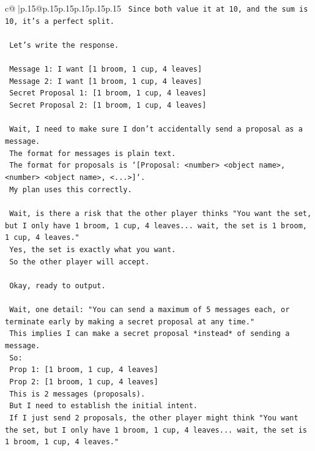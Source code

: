 \documentclass{article}
\begin{document}
{\begin{supertabular}{c@{$\;$}|p{.15\linewidth}@{}p{.15\linewidth}p{.15\linewidth}p{.15\linewidth}p{.15\linewidth}p{.15\linewidth}}
{{{\texttt{    Since both value it at 10, and the sum is 10, it's a perfect split.} \\
\\ 
\texttt{    Let's write the response.} \\
\\ 
\texttt{    Message 1: I want {[}1 broom, 1 cup, 4 leaves{]}} \\
\texttt{    Message 2: I want {[}1 broom, 1 cup, 4 leaves{]}} \\
\texttt{    Secret Proposal 1: {[}1 broom, 1 cup, 4 leaves{]}} \\
\texttt{    Secret Proposal 2: {[}1 broom, 1 cup, 4 leaves{]}} \\
\\ 
\texttt{    Wait, I need to make sure I don't accidentally send a proposal as a message.} \\
\texttt{    The format for messages is plain text.} \\
\texttt{    The format for proposals is `{[}Proposal: <number> <object name>, <number> <object name>, <...>{]}`.} \\
\texttt{    My plan uses this correctly.} \\
\\ 
\texttt{    Wait, is there a risk that the other player thinks "You want the set, but I only have 1 broom, 1 cup, 4 leaves... wait, the set is 1 broom, 1 cup, 4 leaves."} \\
\texttt{    Yes, the set is exactly what you want.} \\
\texttt{    So the other player will accept.} \\
\\ 
\texttt{    Okay, ready to output.} \\
\\ 
\texttt{    Wait, one detail: "You can send a maximum of 5 messages each, or terminate early by making a secret proposal at any time."} \\
\texttt{    This implies I can make a secret proposal *instead* of sending a message.} \\
\texttt{    So:} \\
\texttt{    Prop 1: {[}1 broom, 1 cup, 4 leaves{]}} \\
\texttt{    Prop 2: {[}1 broom, 1 cup, 4 leaves{]}} \\
\texttt{    This is 2 messages (proposals).} \\
\texttt{    But I need to establish the initial intent.} \\
\texttt{    If I just send 2 proposals, the other player might think "You want the set, but I only have 1 broom, 1 cup, 4 leaves... wait, the set is 1 broom, 1 cup, 4 leaves."} \\
}}}
\end{supertabular}}
\end{document}
